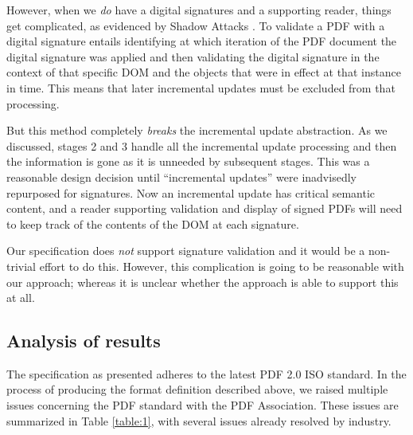 However, when we \emph{do} have a digital signatures and a supporting
reader, things get complicated, as evidenced by Shadow Attacks
\cite{mladenovTrillionDollarRefund2019,ndsssymposiumNDSS2021Shadow2021}.
%
To validate a PDF with a digital signature entails identifying at
which iteration of the PDF document the digital signature was applied
and then validating the digital signature in the context of that
specific DOM and the objects that were in effect at that instance in
time. This means that later incremental updates must be excluded from
that processing.

But this method completely \emph{breaks} the incremental update
abstraction.  As we discussed, stages 2 and 3 handle all
the incremental update processing and then the information is gone as
it is unneeded by subsequent stages.
% 
This was a reasonable design decision until ``incremental updates'' were
inadvisedly repurposed for signatures.  Now an incremental update has
critical semantic content, and a reader supporting validation and display of
signed PDFs will need to keep track of the contents of the DOM at each
signature.

Our specification does \emph{not} support signature validation
and it would be a non-trivial effort to do this.  However,
this complication is going to be reasonable with our \ssp{} approach;
whereas it is unclear whether the \dsp{} approach is able to support
this at all.


\subsection{Analysis of results}
\label{sec:results-analysis}

The specification as presented adheres to the latest PDF 2.0 ISO standard.
In the process of producing the format definition described above, we
raised multiple issues concerning the PDF standard with the PDF Association. 
These issues are summarized in Table \ref{table:1}, with several issues already
resolved by industry.

